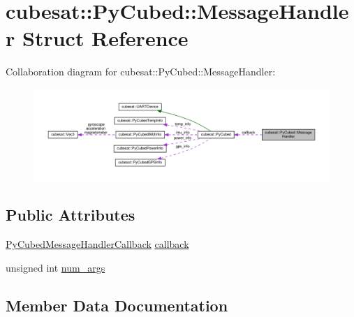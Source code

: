 \hypertarget{structcubesat_1_1PyCubed_1_1MessageHandler}{}\section{cubesat\+:\+:Py\+Cubed\+:\+:Message\+Handler Struct Reference}
\label{structcubesat_1_1PyCubed_1_1MessageHandler}


Collaboration diagram for cubesat\+:\+:Py\+Cubed\+:\+:Message\+Handler\+:
\nopagebreak
\begin{figure}[H]
\begin{center}
\leavevmode
\includegraphics[width=350pt]{structcubesat_1_1PyCubed_1_1MessageHandler__coll__graph}
\end{center}
\end{figure}
\subsection*{Public Attributes}
\begin{DoxyCompactItemize}
\item 
\hyperlink{namespacecubesat_a3b98f17d41bf0e37fe0d382b897f9692}{Py\+Cubed\+Message\+Handler\+Callback} \hyperlink{structcubesat_1_1PyCubed_1_1MessageHandler_a9c4a599d7224add95ab56e915095497e}{callback}
\item 
unsigned int \hyperlink{structcubesat_1_1PyCubed_1_1MessageHandler_a42724ac13a929837460a2d1923f47514}{num\+\_\+args}
\end{DoxyCompactItemize}


\subsection{Member Data Documentation}
\mbox{\label{structcubesat_1_1PyCubed_1_1MessageHandler_a9c4a599d7224add95ab56e915095497e}} 
